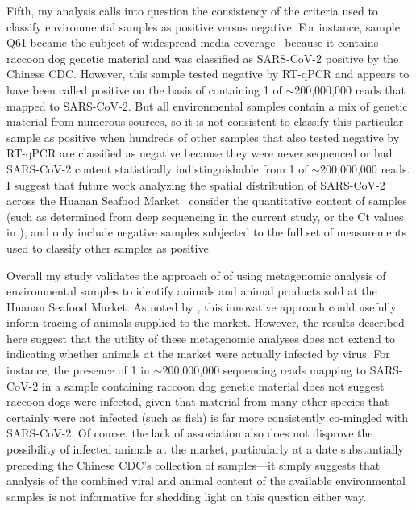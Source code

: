\documentclass[9pt,twocolumn,twoside]{gsajnl_modified}
\begin{document}
Fifth, my analysis calls into question the consistency of the criteria used to classify environmental samples as positive versus negative.
For instance, sample Q61 became the subject of widespread media coverage~\citep{wu2023atlantic, mueller2023nytimes} because it contains raccoon dog genetic material and was classified as SARS-CoV-2 positive by the Chinese CDC.
However, this sample tested negative by RT-qPCR and appears to have been called positive on the basis of containing 1 of $\sim$200,000,000 reads that mapped to SARS-CoV-2.
But all environmental samples contain a mix of genetic material from numerous sources, so it is not consistent to classify this particular sample as positive when hundreds of other samples that also tested negative by RT-qPCR are classified as negative because they were never sequenced or had SARS-CoV-2 content statistically indistinguishable from 1 of $\sim$200,000,000 reads.
I suggest that future work analyzing the spatial distribution of SARS-CoV-2 across the Huanan Seafood Market~\citep{worobey2022huanan,courtier2022sars,crits2023genetic} consider the quantitative content of samples (such as determined from deep sequencing in the current study, or the Ct values in \citet{liu2023surveillance}), and only include negative samples subjected to the full set of measurements used to classify other samples as positive.

Overall my study validates the approach of \citet{crits2023genetic} of using metagenomic analysis of environmental samples to identify animals and animal products sold at the Huanan Seafood Market.
As noted by \citet{crits2023genetic}, this innovative approach could usefully inform tracing of animals supplied to the market.
However, the results described here suggest that the utility of these metagenomic analyses does not extend to indicating whether animals at the market were actually infected by virus.
For instance, the presence of 1 in $\sim$200,000,000 sequencing reads mapping to SARS-CoV-2 in a sample containing raccoon dog genetic material does not suggest raccoon dogs were infected, given that material from many other species that certainly were not infected (such as fish) is far more consistently co-mingled with SARS-CoV-2.
Of course, the lack of association also does not disprove the possibility of infected animals at the market, particularly at a date substantially preceding the Chinese CDC's collection of samples---it simply suggests that analysis of the combined viral and animal content of the available environmental samples is not informative for shedding light on this question either way.
\end{document}
